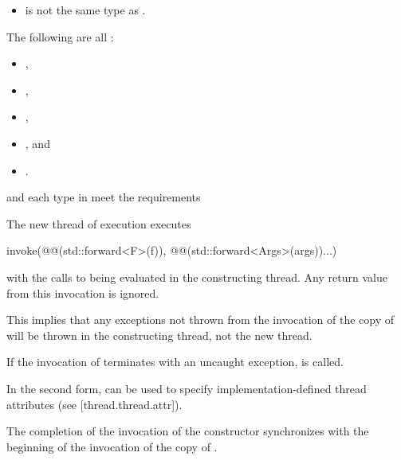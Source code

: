 \documentclass{wg21}
\begin{document}
\begin{itemdescr}
\pnum
\constraints
\begin{itemize}
\item {} is not the same type as .
\end{itemize} 
\pnum
\mandates
The following are all :
\begin{itemize}
    \item {},
    \item {},
    \item {},
    \item {}, and
    \item {}.
\end{itemize}

\pnum
\expects
{} and each type in  meet the
 requirements

\pnum
\effects
The new thread of execution executes
\begin{codeblock}
    invoke(@@(std::forward<F>(f)), @@(std::forward<Args>(args))...)
\end{codeblock}
with the calls to
 being evaluated in the constructing thread.
Any return value from this invocation is ignored.
\begin{note}
    This implies that any exceptions not thrown from the invocation of the copy
    of  will be thrown in the constructing thread, not the new thread.
\end{note}
If the invocation of  terminates with an uncaught exception,
 is called.

\begin{addedblock}
In the second form,  can be used to specify implementation-defined thread attributes (see [thread.thread.attr]).
\end{addedblock}

\pnum
\sync
The completion of the invocation of the constructor
synchronizes with the beginning of the invocation of the copy of .


\end{itemdescr}
\end{document}

